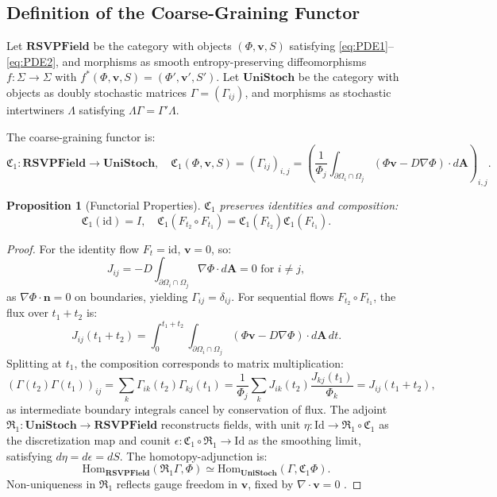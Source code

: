 \documentclass[12pt]{article}
\newtheorem{proposition}{Proposition}
\begin{document}
\subsection{Definition of the Coarse-Graining Functor}

Let \(\mathbf{RSVPField}\) be the category with objects \((\Phi, \mathbf{v}, S)\) satisfying \eqref{eq:PDE1}--\eqref{eq:PDE2}, and morphisms as smooth entropy-preserving diffeomorphisms \(f: \Sigma \to \Sigma\) with \(f^*(\Phi, \mathbf{v}, S) = (\Phi', \mathbf{v}', S')\). Let \(\mathbf{UniStoch}\) be the category with objects as doubly stochastic matrices \(\Gamma = (\Gamma_{ij})\), and morphisms as stochastic intertwiners \(\Lambda\) satisfying \(\Lambda \Gamma = \Gamma' \Lambda\).

\begin{definition}
The coarse-graining functor is:
\[
\mathfrak{C}_1: \mathbf{RSVPField} \to \mathbf{UniStoch}, \quad \mathfrak{C}_1(\Phi, \mathbf{v}, S) = \left( \Gamma_{ij} \right)_{i,j} = \left( \frac{1}{\Phi_j} \int_{\partial \Omega_i \cap \Omega_j} (\Phi \mathbf{v} - D \nabla \Phi) \cdot d\mathbf{A} \right)_{i,j}.
\]
\end{definition}

\begin{proposition}[Functorial Properties]
\label{prop:functor}
\(\mathfrak{C}_1\) preserves identities and composition:
\[
\mathfrak{C}_1(\mathrm{id}) = I, \quad \mathfrak{C}_1(F_{t_2} \circ F_{t_1}) = \mathfrak{C}_1(F_{t_2}) \mathfrak{C}_1(F_{t_1}).
\]
\end{proposition}

\begin{proof}
For the identity flow \(F_t = \mathrm{id}\), \(\mathbf{v} = 0\), so:
\[
J_{ij} = -D \int_{\partial \Omega_i \cap \Omega_j} \nabla \Phi \cdot d\mathbf{A} = 0 \text{ for } i \neq j,
\]
as \(\nabla \Phi \cdot \mathbf{n} = 0\) on boundaries, yielding \(\Gamma_{ij} = \delta_{ij}\). For sequential flows \(F_{t_2} \circ F_{t_1}\), the flux over \(t_1 + t_2\) is:
\[
J_{ij}(t_1 + t_2) = \int_0^{t_1 + t_2} \int_{\partial \Omega_i \cap \Omega_j} (\Phi \mathbf{v} - D \nabla \Phi) \cdot d\mathbf{A} \, dt.
\]
Splitting at \(t_1\), the composition corresponds to matrix multiplication:
\[
(\Gamma(t_2) \Gamma(t_1))_{ij} = \sum_k \Gamma_{ik}(t_2) \Gamma_{kj}(t_1) = \frac{1}{\Phi_j} \sum_k J_{ik}(t_2) \frac{J_{kj}(t_1)}{\Phi_k} = J_{ij}(t_1 + t_2),
\]
as intermediate boundary integrals cancel by conservation of flux. The adjoint \(\mathfrak{R}_1: \mathbf{UniStoch} \to \mathbf{RSVPField}\) reconstructs fields, with unit \(\eta: \mathrm{Id} \to \mathfrak{R}_1 \circ \mathfrak{C}_1\) as the discretization map and counit \(\epsilon: \mathfrak{C}_1 \circ \mathfrak{R}_1 \to \mathrm{Id}\) as the smoothing limit, satisfying \(d\eta = d\epsilon = dS\). The homotopy-adjunction is:
\[
\mathrm{Hom}_{\mathbf{RSVPField}}(\mathfrak{R}_1 \Gamma, \Phi) \simeq \mathrm{Hom}_{\mathbf{UniStoch}}(\Gamma, \mathfrak{C}_1 \Phi).
\]
Non-uniqueness in \(\mathfrak{R}_1\) reflects gauge freedom in \(\mathbf{v}\), fixed by \(\nabla \cdot \mathbf{v} = 0\) \cite{Pantev2013}.
\end{proof}
\end{document}
